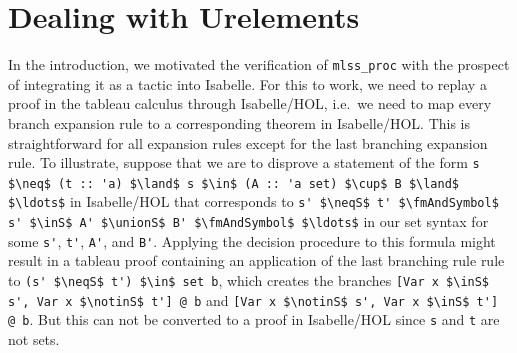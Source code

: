 \documentclass[runningheads]{llncs}
\newcommand{\unionS}{\sqcup_\text{s}}
\newcommand{\inS}{\in_\text{s}}
\newcommand{\notinS}{\notin_\text{s}}
\newcommand{\neqS}{\neq_\text{s}}
\newcommand{\fmAndSymbol}{\boldsymbol{\land}}
\begin{document}
\section{Dealing with Urelements}
In the introduction, we motivated the verification of \lstinline!mlss_proc! with the prospect of integrating it as a tactic into Isabelle.
For this to work, we need to replay a proof in the tableau calculus through Isabelle/HOL, i.e.\ we need to map every branch expansion rule to a corresponding theorem in Isabelle/HOL.
This is straightforward for all expansion rules except for the last branching expansion rule.
To illustrate, suppose that we are to disprove a statement of the form \lstinline!s $\neq$ (t :: 'a) $\land$ s $\in$ (A :: 'a set) $\cup$ B $\land$ $\ldots$! in Isabelle/HOL
that corresponds to \lstinline!s' $\neqS$ t' $\fmAndSymbol$ s' $\inS$ A' $\unionS$ B' $\fmAndSymbol$ $\ldots$! in our set syntax for some \lstinline!s'!, \lstinline!t'!, \lstinline!A'!, and \lstinline!B'!.
Applying the decision procedure to this formula might result in a tableau proof containing an application of the last branching rule rule to \lstinline!(s' $\neqS$ t') $\in$ set b!, which creates the branches \lstinline![Var x $\inS$ s', Var x $\notinS$ t'] @ b! and \lstinline![Var x $\notinS$ s', Var x $\inS$ t'] @ b!.
But this can not be converted to a proof in Isabelle/HOL since \lstinline!s! and \lstinline!t! are not sets.
\end{document}
